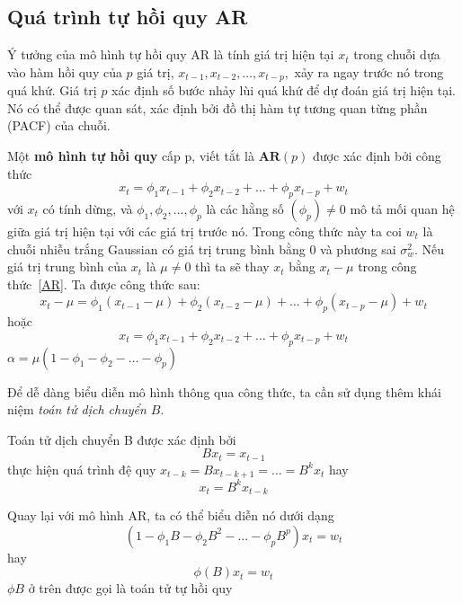 \subsection{Quá trình tự hồi quy AR}
	Ý tưởng của mô hình tự hồi quy AR là tính giá trị hiện tại $x_t$ trong chuỗi dựa vào hàm hồi quy của $p$ giá trị, $x_{t-1},x_{t-2},\dots,x_{t-p},$ xảy ra ngay trước nó trong quá khứ. Giá trị $p$ xác định số bước nhảy lùi quá khứ để dự đoán giá trị hiện tại. Nó có thể được quan sát, xác định bởi đồ thị hàm tự tương quan từng phần (PACF) của chuỗi.
	\begin{defi} Một \textbf{mô hình tự hồi quy} cấp p, viết tắt là $\textbf{AR}(p)$ được xác định bởi công thức 
			\begin{equation}\label{AR}			
			x_t = \phi_1x_{t-1} + \phi_2x_{t-2} + \dots + \phi_px_{t-p} + w_t
			\end{equation}
			với $x_t$ có tính dừng, và $\phi_1, \phi_2,\dots,\phi_p$ là các hằng số $(\phi_p)\neq 0$ mô tả mối quan hệ giữa giá trị hiện tại với các giá trị trước nó. Trong công thức này ta coi $w_t$ là chuỗi nhiễu trắng Gaussian có giá trị trung bình bằng $0$ và phương sai $\sigma^2_w$. Nếu giá trị trung bình của $x_t$ là $\mu \neq 0$ thì ta sẽ thay $x_t$ bằng $x_t - \mu$ trong công thức~\ref{AR}. Ta được công thức sau:
			\begin{equation}\label{AR}			
			x_t-\mu = \phi_1(x_{t-1}-\mu) + \phi_2(x_{t-2}-\mu) + \dots + \phi_p(x_{t-p}-\mu) + w_t 
			\end {equation}
			hoặc
			\begin{equation}
			x_t = \phi_1x_{t-1} + \phi_2x_{t-2} + \dots + \phi_px_{t-p} + w_t 
			\end{equation}
			 $ \alpha = \mu (1-\phi_1 - \phi_2-\dots- \phi_p)	$
	\end{defi}

Để dễ dàng biểu diễn mô hình thông qua công thức, ta cần sử dụng thêm khái niệm \textit{toán tử dịch chuyển $B$}.
\begin{defi}
	Toán tử dịch chuyển B được xác định bởi
	\begin{equation}
		Bx_t = x_{t-1}
	\end{equation}
	thực hiện quá trình đệ quy $x_{t-k}=Bx_{t-k+1}=...=B^kx_t$ hay
	\begin{equation}
		x_{t} = B^kx_{t-k}
	\end{equation}
\end{defi}
Quay lại với mô hình AR, ta có thể biểu diễn nó dưới dạng
\begin{equation}
	(1-\phi_1B-\phi_2B^{2}-...-\phi_pB^{p})x_t = w_t
\end{equation}
hay
\begin{equation} 
	\phi(B)x_t=w_t
\end{equation}
$\phi B$ ở trên được gọi là toán tử tự hồi quy

